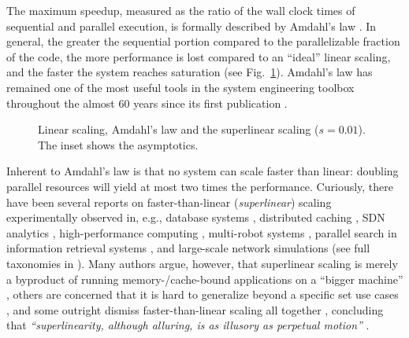 The maximum speedup, measured as the ratio of the wall clock times of sequential and parallel execution, is formally described by Amdahl's law \cite{10.1145/1465482.1465560}. In general, the greater the sequential portion compared to the parallelizable fraction of the code, the more performance is lost compared to an ``ideal'' linear scaling, and the faster the system reaches saturation (see Fig.~\ref{fig:amdahl}). Amdahl's law has remained one of the most useful tools in the system engineering toolbox throughout the almost 60 years since its first publication \cite{10.5555/1951599, 10.1145/42411.42415, 4563876, 6280307,1580395,406581,6163449, 10.5555/775339.775386}.

\begin{figure}[t]
  \centering
  \begin{small}
  
\end{small}
  \caption{Linear scaling, Amdahl's law and the superlinear scaling ($s=0.01$). The inset shows the asymptotics.}
  \label{fig:amdahl}
\end{figure}

Inherent to Amdahl's law is that no system can scale faster than linear: doubling parallel resources will yield at most two times the performance. Curiously, there have been several reports on faster-than-linear (\emph{superlinear}) scaling experimentally observed in, e.g., database systems \cite{scalability-analyzed, 10.5555/1012889.1012894}, distributed caching \cite{271208, dobb-2}, SDN analytics \cite{sdn-analytitcs}, high-performance computing \cite{556383, 7733347, 6483679}, multi-robot systems \cite{10.1007/978-3-319-77610-1},  parallel search in information retrieval systems \cite{dobb-1, dobb-2}, and large-scale network simulations \cite{10.1145/3627703.3629574} (see full taxonomies in \cite{7733347, 80148}).
Many authors argue, however, that superlinear scaling is merely a byproduct of running memory-\slash cache-bound applications on a ``bigger machine'' \cite{80148}, others are concerned that it is hard to generalize beyond a specific set use cases \cite{7733347, 80148}, and some outright dismiss faster-than-linear scaling all together \cite{gunther-hotsos, 10.1016/0167-8191(86)90024-4}, concluding that \emph{``superlinearity, although alluring, is as illusory as perpetual motion''} \cite{10.1145/2773212.2789974}.

